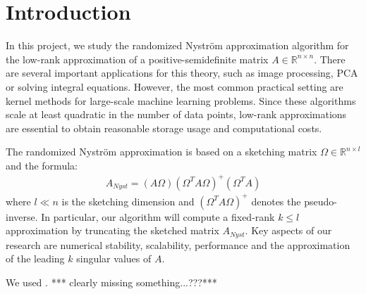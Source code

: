\documentclass{article}
\date{\today}
\theoremstyle{definition}
\begin{document}
\hypersetup{pageanchor=false}


\clearpage
\thispagestyle{empty}
\tableofcontents

\clearpage
\hypersetup{pageanchor=true} %
\setcounter{page}{1}

\section{Introduction}
In this project, we study the randomized Nyström approximation algorithm for the low-rank approximation of a positive-semidefinite matrix $A\in \mathbb{R}^{n \times n}$. There are several important applications for this theory, such as image processing, PCA or solving integral equations. However, the most common practical setting are kernel methods for large-scale machine learning problems. Since these algorithms scale at least quadratic in the number of data points, low-rank approximations are essential to obtain reasonable storage usage and computational costs. 

The randomized Nyström approximation is based on a sketching matrix $\Omega \in \mathbb{R}^{n \times l}$ and the formula:
\begin{align}
    \label{nyst:sketching_formula}
    A_{Nyst} = (A \Omega) (\Omega^T A \Omega)^+ (\Omega^T A)
\end{align}
where $l \ll n$ is the sketching dimension and $(\Omega^T A \Omega)^+$ denotes the pseudo-inverse. In particular, our algorithm will compute a fixed-rank $k \leq l$ approximation by truncating the sketched matrix $A_{Nyst}$. Key aspects of our research are numerical stability, scalability, performance and the approximation of the leading $k$ singular values of $A$.

We used \cite{golub2013a}.
*** clearly missing something...???***
\end{document}
